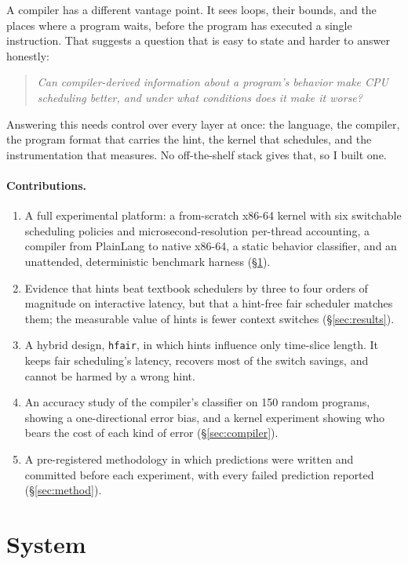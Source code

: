 \documentclass[10pt,twocolumn]{article}
\newcommand{\pol}[1]{\texttt{#1}}
\begin{document}
A compiler has a different vantage point. It sees loops, their bounds, and the places where
a program waits, before the program has executed a single instruction. That suggests a
question that is easy to state and harder to answer honestly:

\begin{quote}
\emph{Can compiler-derived information about a program's behavior make CPU scheduling
better, and under what conditions does it make it worse?}
\end{quote}

\noindent Answering this needs control over every layer at once: the language, the
compiler, the program format that carries the hint, the kernel that schedules, and the
instrumentation that measures. No off-the-shelf stack gives that, so I built one.

\paragraph{Contributions.}
\begin{enumerate}\setlength\itemsep{1pt}
\item A full experimental platform: a from-scratch x86-64 kernel with six switchable
scheduling policies and microsecond-resolution per-thread accounting, a compiler from
PlainLang to native x86-64, a static behavior classifier, and an unattended,
deterministic benchmark harness (\S\ref{sec:system}).
\item Evidence that hints beat textbook schedulers by three to four orders of magnitude on
interactive latency, but that a hint-free fair scheduler matches them; the measurable value
of hints is fewer context switches (\S\ref{sec:results}).
\item A hybrid design, \pol{hfair}, in which hints influence only time-slice length. It
keeps fair scheduling's latency, recovers most of the switch savings, and cannot be harmed
by a wrong hint.
\item An accuracy study of the compiler's classifier on 150 random programs, showing a
one-directional error bias, and a kernel experiment showing who bears the cost of each
kind of error (\S\ref{sec:compiler}).
\item A pre-registered methodology in which predictions were written and committed before
each experiment, with every failed prediction reported (\S\ref{sec:method}).
\end{enumerate}

\section{System}\label{sec:system}
\end{document}

